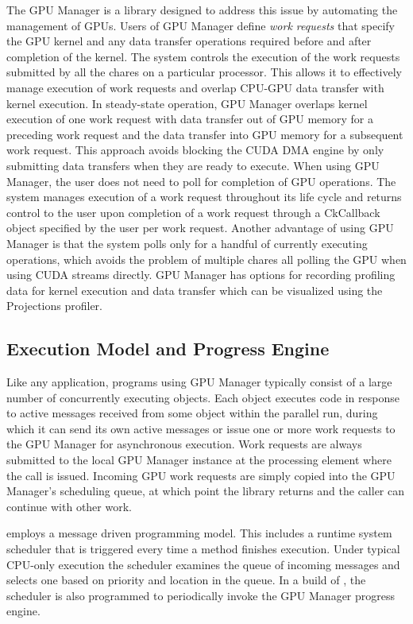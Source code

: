 The \charmpp{} GPU Manager is a library designed to address this issue by
automating the management of GPUs. Users of GPU Manager define \emph{work requests}
that specify the GPU kernel and any data transfer operations required before
and after completion of the kernel. The system controls the execution of the
work requests submitted by all the chares on a particular processor. This allows
it to effectively manage execution of work requests and overlap CPU-GPU data
transfer with kernel execution. In steady-state operation, GPU Manager overlaps
kernel execution of one work request with data transfer out of GPU memory for a
preceding work request and the data transfer into GPU memory for a subsequent
work request. This approach avoids blocking the CUDA DMA engine by only submitting
data transfers when they are ready to execute. When using GPU Manager, the user
does not need to poll for completion of GPU operations. The system manages
execution of a work request throughout its life cycle and returns control to the
user upon completion of a work request through a CkCallback object specified by
the user per work request. Another advantage of using GPU Manager is that the
system polls only for a handful of currently executing operations, which avoids
the problem of multiple chares all polling the GPU when using CUDA streams
directly. GPU Manager has options for recording profiling data for kernel
execution and data transfer which can be visualized using the \charmpp{}
Projections profiler.

\subsection{Execution Model and Progress Engine}

Like any \charmpp{} application, programs using GPU Manager typically consist of a
large number of concurrently executing objects. Each object executes code in
response to active messages received from some object within the parallel run,
during which it can send its own active messages or issue one or more work
requests to the GPU Manager for asynchronous execution. Work requests are always
submitted to the local GPU Manager instance at the processing element where the
call is issued. Incoming GPU work requests are simply copied into the GPU
Manager's scheduling queue, at which point the library returns and the caller
can continue with other work.

\charmpp{} employs a message driven programming model. This includes a runtime
system scheduler that is triggered every time a method finishes execution. Under
typical CPU-only execution the scheduler examines the queue of incoming messages
and selects one based on priority and location in the queue. In a \cuda{}
build of \charmpp{}, the scheduler is also programmed to periodically invoke the
GPU Manager progress engine.

